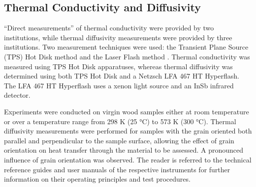\documentclass{book}
\begin{document}
%

\subsection{Thermal Conductivity and Diffusivity}
\label{g_tests_conductivity}
“Direct measurements” of thermal conductivity were provided by two institutions, while thermal diffusivity measurements were provided by three institutions. Two measurement techniques were used: the Transient Plane Source (TPS) Hot Disk method \cite{gustafsson1991transient} and the Laser Flash method \cite{NeztschLFA}. Thermal conductivity was measured using TPS Hot Disk apparatuses, whereas thermal diffusivity was determined using both TPS Hot Disk and a Netzsch LFA 467 HT Hyperflash. The LFA 467 HT Hyperflash uses a xenon light source and an InSb infrared detector.

Experiments were conducted on virgin wood samples either at room temperature or over a temperature range from 298 K (25 °C) to 573 K (300 °C). Thermal diffusivity measurements were performed for samples with the grain oriented both parallel and perpendicular to the sample surface, allowing the effect of grain orientation on heat transfer through the material to be assessed. A pronounced influence of grain orientation was observed. The reader is referred to the technical reference guides and user manuals of the respective instruments for further information on their operating principles and test procedures.

\end{document}
